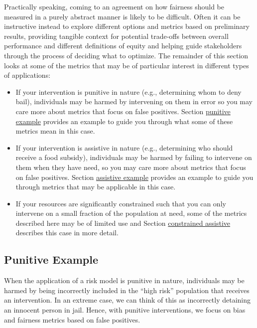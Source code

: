 \documentclass[]{krantz}
\begin{document}
Practically speaking, coming to an agreement on how fairness should be
measured in a purely abstract manner is likely to be difficult. Often it
can be instructive instead to explore different options and metrics
based on preliminary results, providing tangible context for potential
trade-offs between overall performance and different definitions of
equity and helping guide stakeholders through the process of deciding
what to optimize. The remainder of this section looks at some of the
metrics that may be of particular interest in different types of
applications:

\begin{itemize}
\item
  If your intervention is punitive in nature (e.g., determining whom to
  deny bail), individuals may be harmed by intervening on them in error
  so you may care more about metrics that focus on false positives.
  Section \protect\hyperlink{sec:punitiveexample}{punitive example}
  provides an example to guide you through what some of these metrics
  mean in this case.
\item
  If your intervention is assistive in nature (e.g., determining who
  should receive a food subsidy), individuals may be harmed by failing
  to intervene on them when they have need, so you may care more about
  metrics that focus on false positives. Section
  \protect\hyperlink{sec:assistiveexample}{assistive example} provides
  an example to guide you through metrics that may be applicable in this
  case.
\item
  If your resources are significantly constrained such that you can only
  intervene on a small fraction of the population at need, some of the
  metrics described here may be of limited use and Section
  \protect\hyperlink{sec:constrainedassistive}{constrained assistive}
  describes this case in more detail.
\end{itemize}

\hypertarget{sec:punitiveexample}{\subsection{Punitive
Example}\label{sec:punitiveexample}}

When the application of a risk model is punitive in nature, individuals
may be harmed by being incorrectly included in the ``high risk''
population that receives an intervention. In an extreme case, we can
think of this as incorrectly detaining an innocent person in jail.
Hence, with punitive interventions, we focus on bias and fairness
metrics based on false positives.
\end{document}
